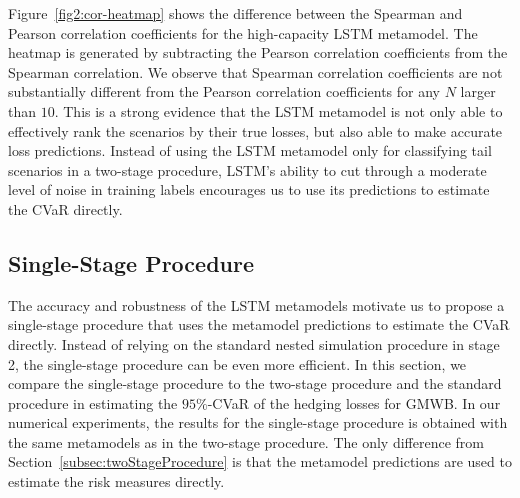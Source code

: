 Figure~\ref{fig2:cor-heatmap} shows the difference between the Spearman and Pearson correlation coefficients for the high-capacity LSTM metamodel.
The heatmap is generated by subtracting the Pearson correlation coefficients from the Spearman correlation.
We observe that Spearman correlation coefficients are not substantially different from the Pearson correlation coefficients for any $N$ larger than $\num{10}$. 
This is a strong evidence that the LSTM metamodel is not only able to effectively rank the scenarios by their true losses, but also able to make accurate loss predictions.
Instead of using the LSTM metamodel only for classifying tail scenarios in a two-stage procedure, LSTM's ability to cut through a moderate level of noise in training labels encourages us to use its predictions to estimate the CVaR directly. 

\subsection{Single-Stage Procedure}

The accuracy and robustness of the LSTM metamodels motivate us to propose a single-stage procedure that uses the metamodel predictions to estimate the CVaR directly. 
Instead of relying on the standard nested simulation procedure in stage 2, the single-stage procedure can be even more efficient.
In this section, we compare the single-stage procedure to the two-stage procedure and the standard procedure in estimating the $95\%$-CVaR of the hedging losses for GMWB.
In our numerical experiments, the results for the single-stage procedure is obtained with the same metamodels as in the two-stage procedure.
The only difference from Section~\ref{subsec:twoStageProcedure} is that the metamodel predictions are used to estimate the risk measures directly.

